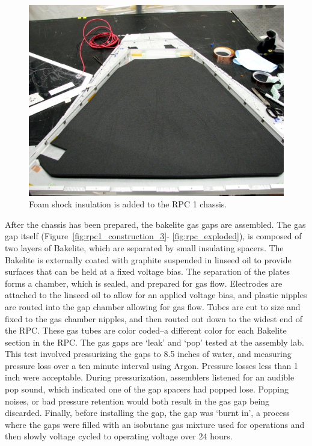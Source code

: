 \begin{figure}
  \centering
  \includegraphics[width=0.7\linewidth]{./figures/rpc1_construction_2}
  \caption{
    Foam shock insulation is added to the RPC 1 chassis.
  }
  \label{fig:rpc1_construction_2}
\end{figure}

After the chassis has been prepared, the bakelite gas gaps are assembled. The
gas gap itself (Figure~\ref{fig:rpc1_construction_3}- \ref{fig:rpc_exploded}),
is composed of two layers of Bakelite, which are separated by small insulating
spacers. The Bakelite is externally coated with graphite suspended in linseed
oil to provide surfaces that can be held at a fixed voltage bias. The separation
of the plates forms a chamber, which is sealed, and prepared for gas flow.
Electrodes are attached to the linseed oil to allow for an applied voltage bias,
and plastic nipples are routed into the gap chamber allowing for gas flow. Tubes
are cut to size and fixed to the gas chamber nipples, and then routed out down
to the widest end of the RPC. These gas tubes are color coded--a different color
for each Bakelite section in the RPC.  The gas gaps are `leak' and `pop' tested
at the assembly lab.  This test involved pressurizing the gaps to 8.5 inches of
water, and measuring pressure loss over a ten minute interval using Argon.
Pressure losses less than 1 inch were acceptable. During pressurization,
assemblers listened for an audible pop sound, which indicated one of the gap
spacers had popped lose. Popping noises, or bad pressure retention would both
result in the gas gap being discarded.  Finally, before installing the gap, the
gap was `burnt in', a process where the gaps were filled with an isobutane gas
mixture used for operations and then slowly voltage cycled to operating voltage
over 24 hours.

